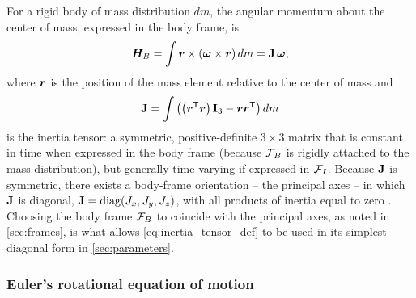For a rigid body of mass distribution $dm$, the angular momentum about the center of mass, expressed in the body frame, is
\begin{equation}
    \bm{H}_B = \int \bm{r}\times(\bm{\omega}\times\bm{r})\,dm = \mathbf{J}\,\bm{\omega},
    \label{eq:ang_momentum}
\end{equation}
where $\bm{r}$ is the position of the mass element relative to the center of mass and
\begin{equation}
    \mathbf{J} = \int \left(\left(\bm{r}^{\mathsf{T}}\bm{r}\right)\mathbf{I}_3 - \bm{r}\bm{r}^{\mathsf{T}}\right) dm
    \label{eq:inertia_tensor_def}
\end{equation}
is the inertia tensor: a symmetric, positive-definite $3\times3$ matrix that is constant in time when expressed in the body frame (because $\mathcal{F}_B$ is rigidly attached to the mass distribution), but generally time-varying if expressed in $\mathcal{F}_I$. Because $\mathbf{J}$ is symmetric, there exists a body-frame orientation -- the principal axes -- in which $\mathbf{J}$ is diagonal, $\mathbf{J} = \operatorname{diag}(J_x, J_y, J_z)$, with all products of inertia equal to zero \cite{hughes2004}. Choosing the body frame $\mathcal{F}_B$ to coincide with the principal axes, as noted in \cref{sec:frames}, is what allows \cref{eq:inertia_tensor_def} to be used in its simplest diagonal form in \cref{sec:parameters}.

\subsubsection{Euler's rotational equation of motion}


